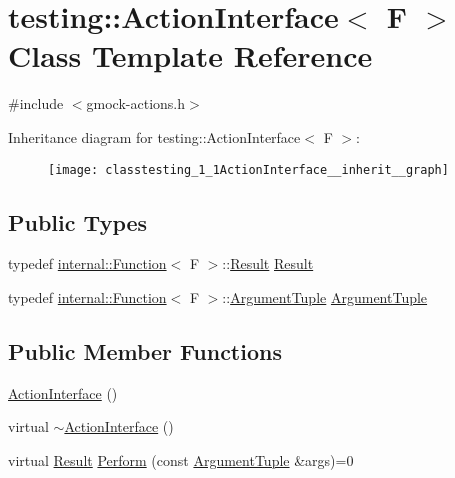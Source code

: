 \hypertarget{classtesting_1_1ActionInterface}{}\section{testing\+:\+:Action\+Interface$<$ F $>$ Class Template Reference}
\label{classtesting_1_1ActionInterface}


{\ttfamily \#include $<$gmock-\/actions.\+h$>$}



Inheritance diagram for testing\+:\+:Action\+Interface$<$ F $>$\+:\nopagebreak
\begin{figure}[H]
\begin{center}
\leavevmode
\texttt{[image: classtesting\_1\_1ActionInterface\_\_inherit\_\_graph]}
\end{center}
\end{figure}
\subsection*{Public Types}
\begin{DoxyCompactItemize}
\item 
typedef \hyperlink{structtesting_1_1internal_1_1Function}{internal\+::\+Function}$<$ F $>$\+::\hyperlink{classtesting_1_1ActionInterface_a7477de2fe3e4e01c59db698203acaee7}{Result} \hyperlink{classtesting_1_1ActionInterface_a7477de2fe3e4e01c59db698203acaee7}{Result}
\item 
typedef \hyperlink{structtesting_1_1internal_1_1Function}{internal\+::\+Function}$<$ F $>$\+::\hyperlink{classtesting_1_1ActionInterface_af72720d864da4d606629e83edc003511}{Argument\+Tuple} \hyperlink{classtesting_1_1ActionInterface_af72720d864da4d606629e83edc003511}{Argument\+Tuple}
\end{DoxyCompactItemize}
\subsection*{Public Member Functions}
\begin{DoxyCompactItemize}
\item 
\hyperlink{classtesting_1_1ActionInterface_a0f1d44e4c669a9cae5ee5b28419a6f52}{Action\+Interface} ()
\item 
virtual \hyperlink{classtesting_1_1ActionInterface_a7dd0a5fc93d86ae3c9d04963b9f3a93f}{$\sim$\+Action\+Interface} ()
\item 
virtual \hyperlink{classtesting_1_1ActionInterface_a7477de2fe3e4e01c59db698203acaee7}{Result} \hyperlink{classtesting_1_1ActionInterface_a20f8624fcea1786f2992b358760422a0}{Perform} (const \hyperlink{classtesting_1_1ActionInterface_af72720d864da4d606629e83edc003511}{Argument\+Tuple} \&args)=0
\end{DoxyCompactItemize}


